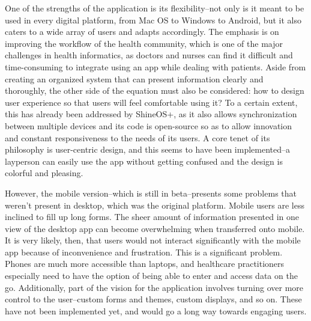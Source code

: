 One of the strengths of the application is its flexibility--not only is it meant to be used in every digital platform, from Mac OS to Windows to Android, but it also caters to a wide array of users and adapts accordingly. The emphasis is on improving the workflow of the health community, which is one of the major challenges in health informatics, as doctors and nurses can find it difficult and time-consuming to integrate using an app while dealing with patients. Aside from creating an organized system that can present information clearly and thoroughly, the other side of the equation must also be considered: how to design user experience so that users will feel comfortable using it? To a certain extent, this has already been addressed by ShineOS+, as it also allows synchronization between multiple devices and its code is open-source so as to allow innovation and constant responsiveness to the needs of its users. A core tenet of its philosophy is user-centric design, and this seems to have been implemented--a layperson can easily use the app without getting confused and the design is colorful and pleasing.

However, the mobile version--which is still in beta--presents some problems that weren’t present in desktop, which was the original platform. Mobile users are less inclined to fill up long forms. The sheer amount of information presented in one view of the desktop app can become overwhelming when transferred onto mobile. It is very likely, then, that users would not interact significantly with the mobile app because of inconvenience and frustration. This is a significant problem. Phones are much more accessible than laptops, and healthcare practitioners especially need to have the option of being able to enter and access data on the go. Additionally, part of the vision for the application involves turning over more control to the user--custom forms and themes, custom displays, and so on. These have not been implemented yet, and would go a long way towards engaging users.

